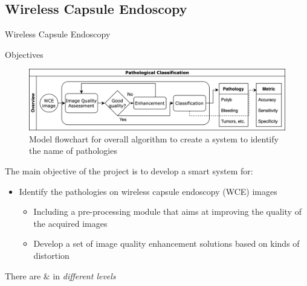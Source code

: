 \documentclass{libs/ufc_format}
\begin{document}
\subsection{Wireless Capsule Endoscopy}
\begin{frame}{Wireless Capsule Endoscopy}


    \pause


\end{frame}

\begin{frame}{Objectives}
    \begin{figure}
        \includegraphics[scale=0.09]{libs/overallalgo.png}
        \caption{Model flowchart for overall algorithm to create a system to identify the name of pathologies}
        \label{fig:overallalgo}
    \end{figure}
    The main objective of the project is to develop a smart system for:
    \begin{itemize}
        \item Identify the pathologies on wireless capsule endoscopy (WCE) images
              \begin{itemize}
                  \item Including a pre-processing module that aims at improving the quality of the acquired images
                  \item Develop a set of image quality enhancement solutions based on kinds of distortion
              \end{itemize}


    \end{itemize}


    There are  $\&$ in \emph{different levels}
\end{frame}
\end{document}
